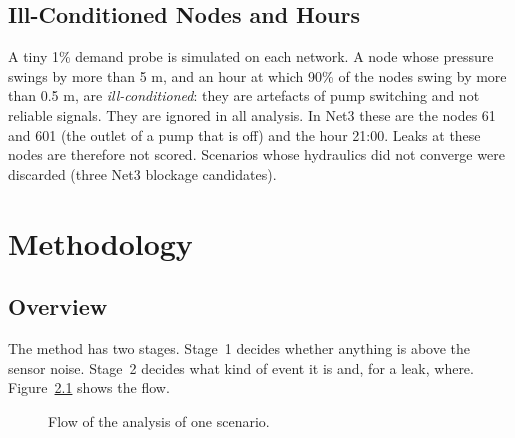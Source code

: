 \documentclass[11pt,letterpaper]{report}
\theoremstyle{definition}
\theoremstyle{plain}
\theoremstyle{remark}
\begin{document}
\section{Ill-Conditioned Nodes and Hours}\label{sec:ill}
A tiny 1\% demand probe is simulated on each network. A node whose pressure swings by more than 5 m, and an hour at which 90\% of the nodes swing by more than 0.5 m, are \emph{ill-conditioned}: they are artefacts of pump switching and not reliable signals. They are ignored in all analysis. In Net3 these are the nodes 61 and 601 (the outlet of a pump that is off) and the hour 21:00. Leaks at these nodes are therefore not scored. Scenarios whose hydraulics did not converge were discarded (three Net3 blockage candidates).

\chapter{Methodology}
\section{Overview}
The method has two stages. Stage~1 decides whether anything is above the sensor noise. Stage~2 decides what kind of event it is and, for a leak, where. Figure~\ref{fig:pipeline} shows the flow.
\begin{figure}[H]
\centering
{}
\caption{Flow of the analysis of one scenario.}\label{fig:pipeline}
\end{figure}
\end{document}

